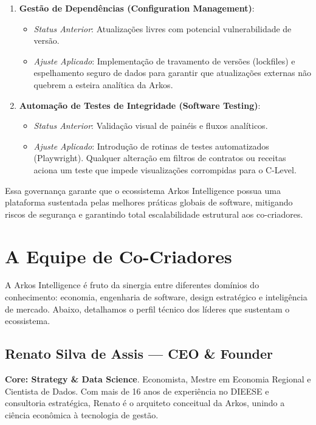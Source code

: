 \documentclass[12pt,a4paper,oneside]{report}
\begin{document}
\begin{enumerate}
    \item \textbf{Gestão de Dependências (Configuration Management)}:
    \begin{itemize}
        \item \textit{Status Anterior}: Atualizações livres com potencial vulnerabilidade de versão.
        \item \textit{Ajuste Aplicado}: Implementação de travamento de versões (lockfiles) e espelhamento seguro de dados para garantir que atualizações externas não quebrem a esteira analítica da Arkos.
    \end{itemize}
    \item \textbf{Automação de Testes de Integridade (Software Testing)}:
    \begin{itemize}
        \item \textit{Status Anterior}: Validação visual de painéis e fluxos analíticos.
        \item \textit{Ajuste Aplicado}: Introdução de rotinas de testes automatizados (Playwright). Qualquer alteração em filtros de contratos ou receitas aciona um teste que impede visualizações corrompidas para o C-Level.
    \end{itemize}
\end{enumerate}

Essa governança garante que o ecossistema Arkos Intelligence possua uma plataforma sustentada pelas melhores práticas globais de software, mitigando riscos de segurança e garantindo total escalabilidade estrutural aos co-criadores.

\pagebreak

\chapter{A Equipe de Co-Criadores}

A Arkos Intelligence é fruto da sinergia entre diferentes domínios do conhecimento: economia, engenharia de software, design estratégico e inteligência de mercado. Abaixo, detalhamos o perfil técnico dos líderes que sustentam o ecossistema.

\section{Renato Silva de Assis — CEO \& Founder}
\textbf{Core: Strategy \& Data Science}.
Economista, Mestre em Economia Regional e Cientista de Dados. Com mais de 16 anos de experiência no DIEESE e consultoria estratégica, Renato é o arquiteto conceitual da Arkos, unindo a ciência econômica à tecnologia de gestão.
\end{document}

